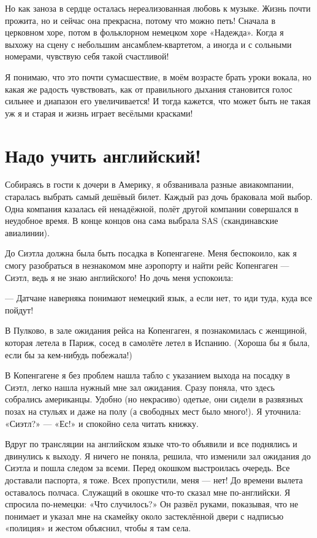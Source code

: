 Но как заноза в сердце осталась нереализованная любовь к музыке.
Жизнь почти прожита, но и сейчас она прекрасна, потому что можно петь! 
Сначала в церковном хоре, потом в фольклорном немецком хоре «Надежда».
Когда я выхожу на сцену с небольшим ансамблем-квартетом, а иногда и с сольными номерами, чувствую себя такой счастливой!

Я понимаю, что это почти сумасшествие, в моём возрасте брать уроки вокала, но какая же радость чувствовать, как от правильного дыхания становится голос сильнее и диапазон его увеличивается! 
И тогда кажется, что может быть не такая уж я и старая и жизнь играет весёлыми красками!

\section*{Надо учить английский!}

Собираясь в гости к дочери в Америку, я обзванивала разные авиакомпании, старалась выбрать самый дешёвый билет.
Каждый раз дочь браковала мой выбор.
Одна компания казалась ей ненадёжной, полёт другой компании совершался в неудобное время.
В конце концов она сама выбрала SAS (скандинавские авиалинии).

До Сиэтла должна была быть посадка в Копенгагене.
Меня беспокоило, как я смогу разобраться в незнакомом мне аэропорту и найти рейс Копенгаген --- Сиэтл, ведь я не знаю английского! 
Но дочь меня успокоила:

--- Датчане наверняка понимают немецкий язык, а если нет, то иди туда, куда все пойдут!

В Пулково, в зале ожидания рейса на Копенгаген, я познакомилась с женщиной, которая летела в Париж, сосед в самолёте летел в Испанию.
(Хороша бы я была, если бы за кем-нибудь побежала!)

В Копенгагене я без проблем нашла табло с указанием выхода на посадку в Сиэтл, легко нашла нужный мне зал ожидания.
Сразу поняла, что здесь собрались американцы.
Удобно (но некрасиво) одетые, они сидели в развязных позах на стульях и даже на полу (а свободных мест было много!).
Я уточнила: «Сиэтл?» --- «Ес!» и спокойно села читать книжку.

Вдруг по трансляции на английском языке что-то объявили и все поднялись и двинулись к выходу.
Я ничего не поняла, решила, что изменили зал ожидания до Сиэтла и пошла следом за всеми.
Перед окошком выстроилась очередь.
Все доставали паспорта, я тоже.
Всех пропустили, меня --- нет! 
До времени вылета оставалось полчаса.
Служащий в окошке что-то сказал мне по-английски.
Я спросила по-немецки: «Что случилось?» 
Он развёл руками, показывая, что не понимает и указал мне на скамейку около застеклённой двери с надписью «полиция» и жестом объяснил, чтобы я там села.

